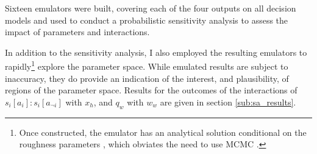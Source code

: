 Sixteen emulators were built, covering each of the four outputs on all decision models and used to conduct a probabilistic sensitivity analysis to assess the impact of parameters and interactions.

In addition to the sensitivity analysis, I also employed the resulting emulators to rapidly\footnote{Once constructed, the emulator has an analytical solution conditional on the roughness parameters \citep{Oakley2002}, which obviates the need to use MCMC \citep{Oakley2004}.} explore the parameter space. While emulated results are subject to inaccuracy, they do provide an indication of the interest, and plausibility, of regions of the parameter space. Results for the outcomes of the interactions of \(s_{i}[a_{i}]:s_{i}[a_{\neg i}]\) with \(x_{h}\), and \(q_{w}\) with \(w_{w}\) are given in section \ref{sub:sa_results}.
